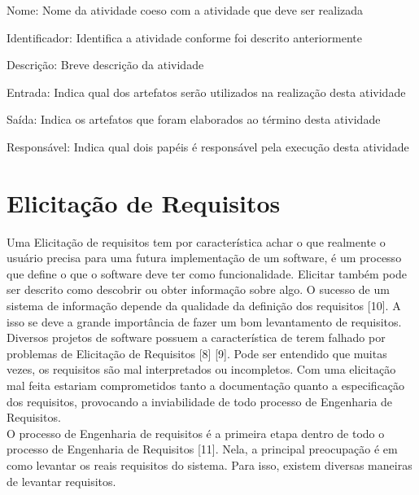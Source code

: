 {{	\onecolumn
		\begin{usecase}

    		\addfield
    			{Nome:}
    			{
    				Nome da atividade coeso com a atividade que deve ser realizada
    			}

			\addfield
    			{Identificador:}
    			{
    				Identifica a atividade conforme foi descrito anteriormente
    			}

    		\addfield
    			{Descrição:}
    			{
    				Breve descrição da atividade
    			}

    		\addfield
    			{Entrada:}
    			{
    				Indica qual dos artefatos serão utilizados na realização desta atividade
    			}

    		\addfield
    			{Saída:}
    			{
    				Indica os artefatos que foram elaborados ao término desta atividade
    			}

			\addfield
    			{Responsável:}
    			{
    				Indica qual dois papéis é responsável pela execução  desta atividade
    			}

		\end{usecase}
	\onecolumn

}



\section{Elicitação de Requisitos}
\label{sec:nova_sess_o}

\tab Uma Elicitação de requisitos tem por característica achar o que realmente o usuário precisa para uma futura implementação de um software, é um processo que define o que o software deve ter como funcionalidade. Elicitar também pode ser descrito como descobrir ou obter informação sobre algo. O sucesso de um sistema de informação depende da qualidade da definição dos requisitos [10]. A isso se deve a grande importância de fazer um bom levantamento de requisitos.\\
\tab Diversos projetos de software possuem a característica de terem falhado por problemas de Elicitação de Requisitos [8] [9]. Pode ser entendido que muitas vezes, os requisitos são mal interpretados ou incompletos. Com uma elicitação mal feita estariam comprometidos tanto a documentação quanto a especificação dos requisitos, provocando a inviabilidade de todo processo de Engenharia de Requisitos.\\
\tab O processo de Engenharia de requisitos é a primeira etapa dentro de todo o processo de Engenharia de Requisitos [11]. Nela, a principal preocupação é em como levantar os reais requisitos do sistema. Para isso, existem diversas maneiras de levantar requisitos. \\

}
